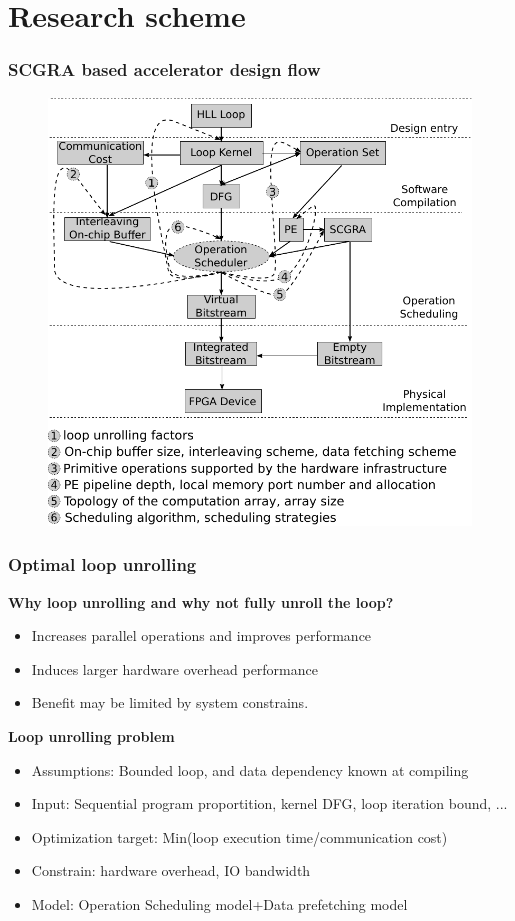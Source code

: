 \documentclass{beamer}
\begin{document}
\section{Research scheme}
\begin{frame}[t]
\frametitle{SCGRA based accelerator design flow}

\begin{figure}
\vspace{-1em}
\includegraphics[width=0.76\linewidth]{design-space-overview2}
\end{figure}

\end{frame}

\begin{frame}[t]
\frametitle{Optimal loop unrolling}

\vspace{-1em}
\textbf{Why loop unrolling and why not fully unroll the loop?}
\begin{itemize}
\item Increases parallel operations and improves performance
\item Induces larger hardware overhead performance 
\item Benefit may be limited by system constrains.
\end{itemize}

\textbf{Loop unrolling problem}
\begin{itemize}
\item Assumptions: Bounded loop, and data dependency known at compiling
\item Input: Sequential program proportition, kernel DFG, loop iteration bound, ...
\item Optimization target: Min(loop execution time/communication cost)
\item Constrain: hardware overhead, IO bandwidth 
\item Model: Operation Scheduling model+Data prefetching model
\end{itemize}
\end{frame}
\end{document}
